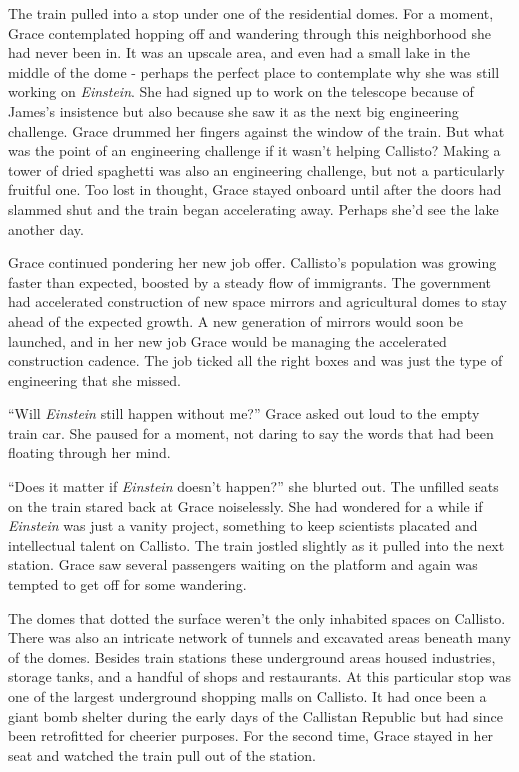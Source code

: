 \documentclass[12pt]{article} %
\begin{document}
The train pulled into a stop under one of the residential domes. For a moment, Grace contemplated hopping off and wandering through this neighborhood she had never been in. It was an upscale area, and even had a small lake in the middle of the dome - perhaps the perfect place to contemplate why she was still working on \textit{Einstein}. She had signed up to work on the telescope because of James's insistence but also because she saw it as the next big engineering challenge. Grace drummed her fingers against the window of the train. But what was the point of an engineering challenge if it wasn't helping Callisto? Making a tower of dried spaghetti was also an engineering challenge, but not a particularly fruitful one. Too lost in thought, Grace stayed onboard until after the doors had slammed shut and the train began accelerating away. Perhaps she'd see the lake another day.

Grace continued pondering her new job offer. Callisto's population was growing faster than expected, boosted by a steady flow of immigrants. The government had accelerated construction of new space mirrors and agricultural domes to stay ahead of the expected growth. A new generation of mirrors would soon be launched, and in her new job Grace would be managing the accelerated construction cadence. The job ticked all the right boxes and was just the type of engineering that she missed.

``Will \textit{Einstein} still happen without me?'' Grace asked out loud to the empty train car. She paused for a moment, not daring to say the words that had been floating through her mind.

``Does it matter if \textit{Einstein} doesn't happen?'' she blurted out. The unfilled seats on the train stared back at Grace noiselessly. She had wondered for a while if \textit{Einstein} was just a vanity project, something to keep scientists placated and intellectual talent on Callisto. The train jostled slightly as it pulled into the next station. Grace saw several passengers waiting on the platform and again was tempted to get off for some wandering.

The domes that dotted the surface weren't the only inhabited spaces on Callisto. There was also an intricate network of tunnels and excavated areas beneath many of the domes. Besides train stations these underground areas housed industries, storage tanks, and a handful of shops and restaurants. At this particular stop was one of the largest underground shopping malls on Callisto. It had once been a giant bomb shelter during the early days of the Callistan Republic but had since been retrofitted for cheerier purposes. For the second time, Grace stayed in her seat and watched the train pull out of the station.
\end{document}

